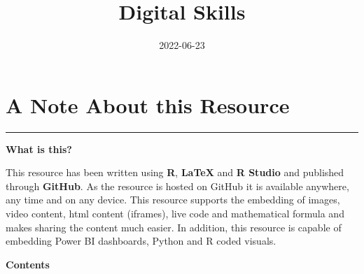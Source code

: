 \documentclass[
]{book}
\title{Digital Skills}
\author{}
\date{\vspace{-2.5em}2022-06-23}
\begin{document}
\maketitle

{
\setcounter{tocdepth}{1}
\tableofcontents
}
\hypertarget{A-Note-About-this-Resource}{%
\chapter*{A Note About this Resource}\label{A-Note-About-this-Resource}}

\begin{center}\rule{0.5\linewidth}{0.5pt}\end{center}

\textbf{What is this?}

This resource has been written using \textbf{R}, \textbf{LaTeX} and \textbf{R Studio} and published through \textbf{GitHub}. As the resource is hosted on GitHub it is available anywhere, any time and on any device. This resource supports the embedding of images, video content, html content (iframes), live code and mathematical formula and makes sharing the content much easier. In addition, this resource is capable of embedding Power BI dashboards, Python and R coded visuals.

\textbf{Contents}
\end{document}
